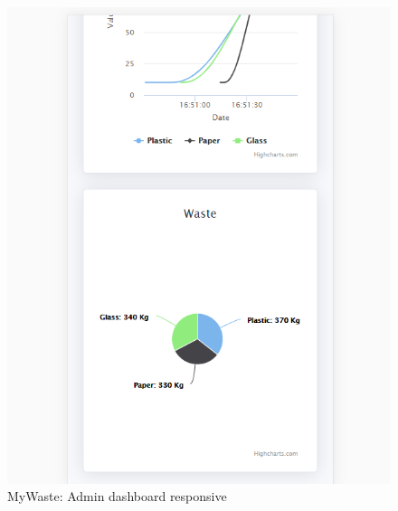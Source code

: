\documentclass{report}
\begin{document}
\begin{figure}[h!]
    \begin{center}
        \includegraphics[width=1.0\textwidth]{images/adminDashboard_resp2.PNG}  \end{center}
    \caption{MyWaste: Admin dashboard responsive}
    \label{fig:respadmindash2}
\end{figure}
\end{document}
